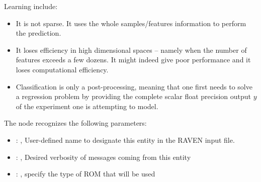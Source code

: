   Learning include:                          \begin{itemize}                            \item It is
  not sparse.                            It uses the whole samples/features information to perform
  the prediction.                            \item It loses efficiency in high dimensional spaces –
  namely when the                            number of features exceeds a few dozens.
  It might indeed give poor performance and it loses computational efficiency.
  \item Classification is only a post-processing, meaning that one first needs
  to solve a regression problem by providing the complete scalar float precision
  output $y$ of the experiment one is attempting to model.                          \end{itemize}

  The  node recognizes the following parameters:
    \begin{itemize}
      \item {}: , 
        User-defined name to designate this entity in the RAVEN input file.
      \item {}: , 
        Desired verbosity of messages coming from this entity
      \item {}: , 
        specify the type of ROM that will be used
  \end{itemize}

